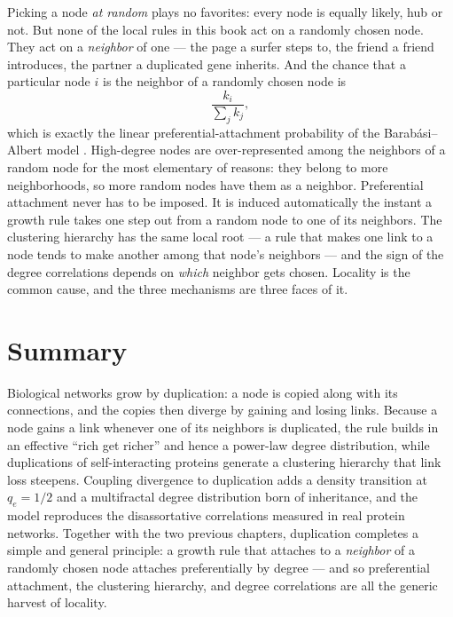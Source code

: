 Picking a node \emph{at random} plays no favorites: every node is equally likely,
hub or not. But none of the local rules in this book act on a randomly chosen
node. They act on a \emph{neighbor} of one --- the page a surfer steps to, the
friend a friend introduces, the partner a duplicated gene inherits. And the
chance that a particular node $i$ is the neighbor of a randomly chosen node is
\begin{equation}
  \frac{k_i}{\sum_j k_j},
  \label{eq:dup-unifying}
\end{equation}
which is exactly the linear preferential-attachment probability of the
Barab\'asi--Albert model \citep{barabasi1999}. High-degree nodes are
over-represented among the neighbors of a random node for the most elementary of
reasons: they belong to more neighborhoods, so more random nodes have them as a
neighbor. Preferential attachment never has to be imposed. It is induced
automatically the instant a growth rule takes one step out from a random node to
one of its neighbors. The clustering hierarchy has the same local root --- a rule
that makes one link to a node tends to make another among that node's neighbors
--- and the sign of the degree correlations depends on \emph{which} neighbor gets
chosen. Locality is the common cause, and the three mechanisms are three faces of
it.

\section{Summary}

Biological networks grow by duplication: a node is copied along with its
connections, and the copies then diverge by gaining and losing links. Because a
node gains a link whenever one of its neighbors is duplicated, the rule builds in
an effective ``rich get richer'' and hence a power-law degree distribution, while
duplications of self-interacting proteins generate a clustering hierarchy that
link loss steepens. Coupling divergence to duplication adds a density transition
at $q_e=1/2$ and a multifractal degree distribution born of inheritance, and the
model reproduces the disassortative correlations measured in real protein
networks. Together with the two previous chapters, duplication completes a simple
and general principle: a growth rule that attaches to a \emph{neighbor} of a
randomly chosen node attaches preferentially by degree --- and so preferential
attachment, the clustering hierarchy, and degree correlations are all the generic
harvest of locality.
